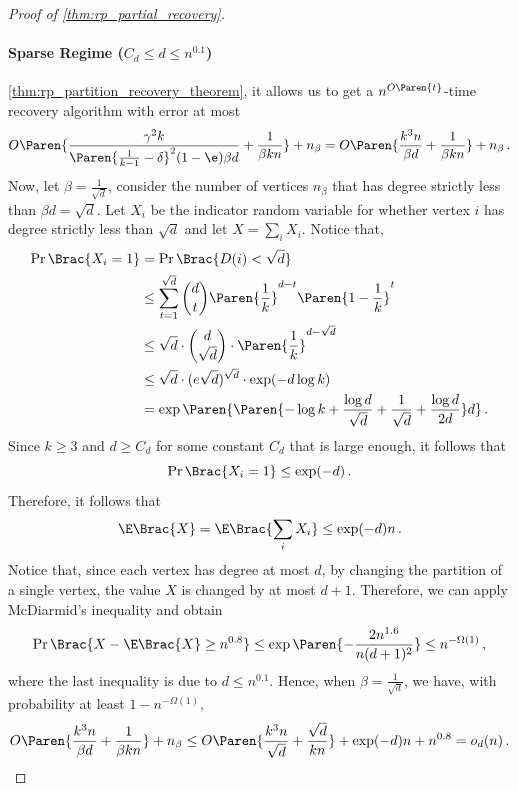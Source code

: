 \begin{proof}[Proof of \cref{thm:rp_partial_recovery}]
    \paragraph{Sparse Regime ($C_d \leq d \leq n^{0.1}$)}
    \cref{thm:rp_partition_recovery_theorem}, it allows us to get a $n^{O\Paren{t}}$-time recovery algorithm with error at most
    \begin{equation*}
        O \Paren{\frac{\gamma^2 k}{\Paren{\frac{1}{k-1} - \delta}^2 (1-\e) \beta d} + \frac{1}{\beta k n}} + n_{\beta}
        = O \Paren{\frac{k^3 n}{\beta d} + \frac{1}{\beta k n}} + n_{\beta} \,.
    \end{equation*}
    Now, let $\beta=\frac{1}{\sqrt{d}}$, consider the number of vertices $n_{\beta}$ that has degree strictly less than $\beta d = \sqrt{d}$.
    Let $X_i$ be the indicator random variable for whether vertex $i$ has degree strictly less than $\sqrt{d}$ and let $X = \sum_i X_i$. Notice that,
    \begin{align*}
        \Pr \Brac{X_i = 1}
        & = \Pr \Brac{D(i) < \sqrt{d}} \\
        & \leq \sum_{t=1}^{\sqrt{d}} \binom{d}{t} \Paren{\frac{1}{k}}^{d-t} \Paren{1-\frac{1}{k}}^{t} \\
        & \leq \sqrt{d} \cdot \binom{d}{\sqrt{d}} \cdot \Paren{\frac{1}{k}}^{d-\sqrt{d}} \\
        & \leq \sqrt{d} \cdot (e \sqrt{d})^{\sqrt{d}} \cdot \exp(- d \log k) \\
        & = \exp \Paren{\Paren{-\log k + \frac{\log d}{\sqrt{d}} + \frac{1}{\sqrt{d}} + \frac{\log d}{2 d}} d} \,.
    \end{align*}
    Since $k \geq 3$ and $d \geq C_d$ for some constant $C_d$ that is large enough, it follows that
    \begin{equation*}
        \Pr \Brac{X_i = 1} \leq \exp(- d) \,.
    \end{equation*}
    Therefore, it follows that
    \begin{equation*}
        \E \Brac{X} = \E \Brac{\sum_i X_i} \leq \exp(-d) n \,.
    \end{equation*}
    Notice that, since each vertex has degree at most $d$, by changing the partition of a single vertex, the value $X$ is changed by at most $d+1$. Therefore, we can apply McDiarmid's inequality and obtain
    \begin{equation*}
        \Pr \Brac{X - \E \Brac{X} \geq n^{0.8}}
        \leq \exp \Paren{- \frac{2 n^{1.6}}{n (d+1)^2}}
        \leq n^{-\Omega(1)} \,,
    \end{equation*}
    where the last inequality is due to $d \leq n^{0.1}$.
    Hence, when $\beta=\frac{1}{\sqrt{d}}$, we have, with probability at least $1 - n^{-\Omega(1)}$,
    \begin{equation*}
        O \Paren{\frac{k^3 n}{\beta d} + \frac{1}{\beta k n}} + n_{\beta}
        \leq O \Paren{\frac{k^3 n}{\sqrt{d}} + \frac{\sqrt{d}}{k n}} + \exp(-d) n + n^{0.8}
        = o_d(n) \,.
    \end{equation*}


\end{proof}
